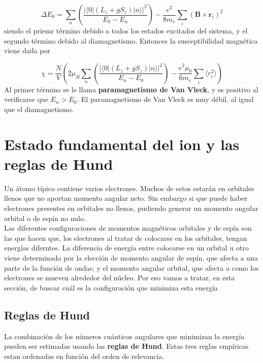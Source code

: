 \documentclass[12pt,a4paper]{book}
\numberwithin{equation}{section}
\numberwithin{figure}{section}
\newcommand{\parentesis}[1]{\left( #1  \right)}
\newcommand{\rn}{\mathbf{r}}
\newcommand{\Bn}{\mathbf{B}}
\begin{document}
\begin{equation}
    \Delta E_0 = \sum_n \parentesis{ \frac{|\langle 0 |(L_z + g S_z)|n\rangle|^2}{E_0 - E_n} } - \frac{e^2}{8 m_e} \sum_i (\Bn \times \rn_i)^2
\end{equation}
siendo el priemr término debido a todos los estados excitados del sistema, y el segundo término debido al diamagnetismo. Entonces la susceptibilidad magnética viene dada por

\begin{equation}
    \chi = \frac{N}{V} \parentesis{ 2\mu_B \sum_n \parentesis{ \frac{|\langle 0 |(L_z + g S_z)|n\rangle|^2}{E_n - E_0} } - \frac{e^2 \mu_0}{6 m_e} \sum_i \langle r_i^2 \rangle }
\end{equation}
Al primer término se le llama \textbf{paramagnetismo de Van Vleck}, y es positivo al verificarse que $E_n>E_0$. El paramagnetismo de Van Vleck es muy débil, al igual que el diamagnetismo. 

\section{Estado fundamental del ion y las reglas de Hund}

Un átomo típico contiene varios electrones. Muchos de estos estarán en orbitales llenos que no aportan momento angular neto. Sin embargo si que puede haber electrones presentes en orbitales no llenos, pudiendo generar un momento angular orbital o de espín no nulo. \\

Las diferentes configuraciones de momentos magnéticos orbitales y de espín son las que hacen que, los electrones al tratar de colocarse en los orbitales, tengan energías diferntes. La diferencia de energía entre colocarse en un orbital u otro viene determinada por la elección de momento angular de espín, que afecta a una parte de la función de ondas; y el momento angular orbital, que afecta a como los electrones se mueven alrededor del núcleo. Por eso vamos a tratar, en esta sección, de buscar cuál es la configuración que minimiza esta energía

\subsection{Reglas de Hund}

La combinación de los números cuánticos angulares que minimizan la energía pueden ser estimadas usando las \textbf{reglas de Hund}. Estas tres reglas empíricas estan ordenadas en función del orden de relevancia. 
\end{document}
